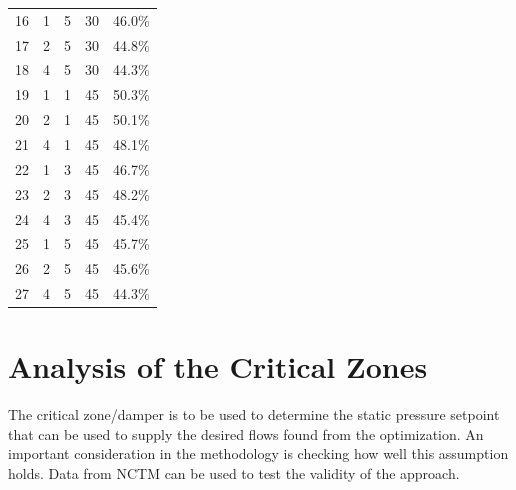 \begin{table}
\begin{tabular}{@{}lllcl@{}}
16  & 1  & 5           & 30                & 46.0\%          \\
17  & 2  & 5           & 30                & 44.8\%          \\
18  & 4  & 5           & 30                & 44.3\%          \\
19  & 1  & 1           & 45                & 50.3\%          \\
20  & 2  & 1           & 45                & 50.1\%          \\
21  & 4  & 1           & 45                & 48.1\%          \\
22  & 1  & 3           & 45                & 46.7\%          \\
23  & 2  & 3           & 45                & 48.2\%          \\
24  & 4  & 3           & 45                & 45.4\%          \\
25  & 1  & 5           & 45                & 45.7\%          \\
26  & 2  & 5           & 45                & 45.6\%          \\
27  & 4  & 5           & 45                & 44.3\%          \\ \bottomrule
\end{tabular}
\end{table}




% 




\section{Analysis of the Critical Zones}

The critical zone/damper is to be used to determine the static pressure
setpoint that can be used to supply the desired flows found from the
optimization. An important consideration in the methodology is checking
how well this assumption holds. Data from NCTM can be used to test the
validity of the approach.

